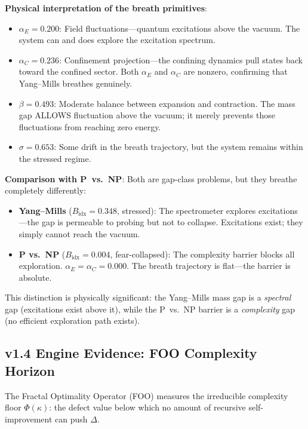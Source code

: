 \documentclass[11pt]{article}
\begin{document}
\noindent
\textbf{Physical interpretation of the breath primitives}:
\begin{itemize}
  \item $\alpha_E = 0.200$: Field fluctuations---quantum excitations
    above the vacuum.  The system can and does explore the excitation
    spectrum.
  \item $\alpha_C = 0.236$: Confinement projection---the confining
    dynamics pull states back toward the confined sector.  Both $\alpha_E$
    and $\alpha_C$ are nonzero, confirming that Yang--Mills breathes
    genuinely.
  \item $\beta = 0.493$: Moderate balance between expansion and
    contraction.  The mass gap ALLOWS fluctuation above the vacuum; it
    merely prevents those fluctuations from reaching zero energy.
  \item $\sigma = 0.653$: Some drift in the breath trajectory, but the
    system remains within the stressed regime.
\end{itemize}

\noindent
\textbf{Comparison with P~vs.~NP}: Both are gap-class problems, but
they breathe completely differently:
\begin{itemize}
  \item \textbf{Yang--Mills} ($B_{\mathrm{idx}} = 0.348$, stressed):
    The spectrometer explores excitations---the gap is permeable to
    probing but not to collapse.  Excitations exist; they simply cannot
    reach the vacuum.
  \item \textbf{P vs.\ NP} ($B_{\mathrm{idx}} = 0.004$,
    fear-collapsed): The complexity barrier blocks all exploration.
    $\alpha_E = \alpha_C = 0.000$.  The breath trajectory is flat---the
    barrier is absolute.
\end{itemize}

\noindent
This distinction is physically significant: the Yang--Mills mass gap is
a \emph{spectral} gap (excitations exist above it), while the
P~vs.~NP barrier is a \emph{complexity} gap (no efficient exploration
path exists).

\subsection{v1.4 Engine Evidence: FOO Complexity Horizon}

The Fractal Optimality Operator (FOO) measures the irreducible
complexity floor $\Phi(\kappa)$: the defect value below which no
amount of recursive self-improvement can push $\Delta$.
\end{document}

